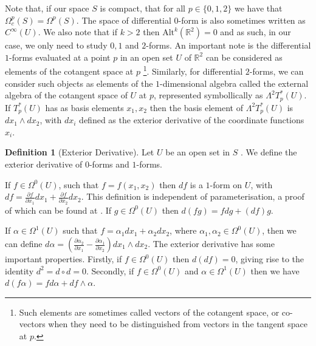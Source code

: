 \documentclass[11pt]{report}
\theoremstyle{definition}
\newtheorem{defn}[thm]{Definition}
\begin{document}
  Note that, if our space $S$ is compact, that for all $p\in \{0,1,2\}$ we have that $\Omega_c^p(S) = \Omega^p(S)$. The space of differential $0$-form is also sometimes written as $C^{\infty}(U)$. We also note that if $k > 2$ then $\text{Alt}^k(\mathbb{R}^2)=0$ and as such, in our case, we only need to study $0,1$ and $2$-forms. An important note is the differential $1$-forms evaluated at a point $p$ in an open set $U$ of $\mathbb{R}^2$ can be considered as elements of the cotangent space at $p$ \footnote{Such elements are sometimes called vectors of the cotangent space, or co-vectors when they need to be distinguished from vectors in the tangent space at $p$.}. Similarly, for differential $2$-forms, we can consider such objects as elements of the $1$-dimensional algebra called the external algebra of the cotangent space of $U$ at $p$, represented symbollically as $\Lambda^2T^*_p(U)$. If $T^*_p(U)$ has as basis elements $x_1, x_2$ then the basis element of $\Lambda^2T^*_p(U)$ is $dx_1\wedge dx_2$, with $dx_i$ defined as the exterior derivative of the coordinate functions $x_i$. 
\begin{defn}[Exterior Derivative]\label{exteriorD}
  Let $U$ be an open set in $S$ . We define the exterior derivative of $0$-forms and $1$-forms.
  
  If $f \in \Omega^0(U)$, such that $f=f(x_1,x_2)$ then $df$ is a $1$-form on $U$, with $df = \frac{\partial f}{\partial x_1}dx_1 +  \frac{\partial f}{\partial x_2}dx_2$. This definition is independent of parameterisation, a proof of which can be found at \cite[p.69]{calcohomo}. If $g \in \Omega^0(U)$ then $d(fg) = fdg + (df)g$.

  If $\alpha \in \Omega^1(U)$ such that $f=\alpha_1 dx_1 + \alpha_2 dx_2$, where $\alpha_1, \alpha_2 \in \Omega^0(U)$, then we can define $d\alpha = \left(\frac{\partial \alpha_2}{\partial x_1} - \frac{\partial \alpha_1}{\partial x_2}\right) dx_1\wedge dx_2$. The exterior derivative has some important properties. Firstly, if $f \in \Omega^0(U)$ then $d(df) = 0$, giving rise to the identity $d^2 = d\circ d = 0$. Secondly, if $f \in \Omega^0(U)$ and $\alpha \in \Omega^1(U)$ then we have $d(f\alpha) = fd\alpha + df \wedge \alpha$. 
\end{defn}
\end{document}
